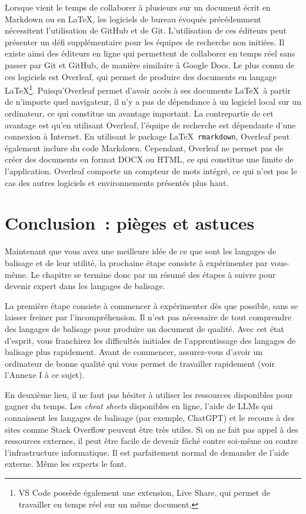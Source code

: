 \documentclass[
  letterpaper,
  DIV=11,
  numbers=noendperiod]{scrreprt}
\begin{document}
Lorsque vient le temps de collaborer à plusieurs sur un document écrit
en Markdown ou en \LaTeX, les logiciels de bureau évoqués précédemment
nécessitent l'utilisation de GitHub et de Git. L'utilisation de ces
éditeurs peut présenter un défi supplémentaire pour les équipes de
recherche non initiées. Il existe ainsi des éditeurs en ligne qui
permettent de collaborer en temps réel sans passer par Git et GitHub, de
manière similaire à Google Docs. Le plus connu de ces logiciels est
Overleaf, qui permet de produire des documents en langage
\LaTeX\footnote{VS Code possède également une extension, Live Share, qui
  permet de travailler en temps réel sur un même document.}.
Puisqu'Overleaf permet d'avoir accès à ses documents \LaTeX~à partir de
n'importe quel navigateur, il n'y a pas de dépendance à un logiciel
local sur un ordinateur, ce qui constitue un avantage important. La
contrepartie de cet avantage est qu'en utilisant Overleaf, l'équipe de
recherche est dépendante d'une connexion à Internet. En utilisant le
package \LaTeX~\texttt{rmarkdown}, Overleaf peut également inclure du
code Markdown. Cependant, Overleaf ne permet pas de créer des documents
en format DOCX ou HTML, ce qui constitue une limite de l'application.
Overleaf comporte un compteur de mots intégré, ce qui n'est pas le cas
des autres logiciels et environnements présentés plus haut.

\hypertarget{conclusion-piuxe8ges-et-astuces}{%
\section{Conclusion~: pièges et
astuces}\label{conclusion-piuxe8ges-et-astuces}}

Maintenant que vous avez une meilleure idée de ce que sont les langages
de balisage et de leur utilité, la prochaine étape consiste à
expérimenter par vous-même. Le chapitre se termine donc par un résumé
des étapes à suivre pour devenir expert dans les langages de balisage.

La première étape consiste à commencer à expérimenter dès que possible,
sans se laisser freiner par l'incompréhension. Il n'est pas nécessaire
de tout comprendre des langages de balisage pour produire un document de
qualité. Avec cet état d'esprit, vous franchirez les difficultés
initiales de l'apprentissage des langages de balisage plus rapidement.
Avant de commencer, assurez-vous d'avoir un ordinateur de bonne qualité
qui vous permet de travailler rapidement (voir l'Annexe I à ce sujet).

En deuxième lieu, il ne faut pas hésiter à utiliser les ressources
disponibles pour gagner du temps. Les \emph{cheat sheets} disponibles en
ligne, l'aide de LLMs qui connaissent les langages de balisage (par
exemple, ChatGPT) et le recours à des sites comme Stack Overflow peuvent
être très utiles. Si on ne fait pas appel à des ressources externes, il
peut être facile de devenir fâché contre soi-même ou contre
l'infrastructure informatique. Il est parfaitement normal de demander de
l'aide externe. Même les experts le font.
\end{document}
